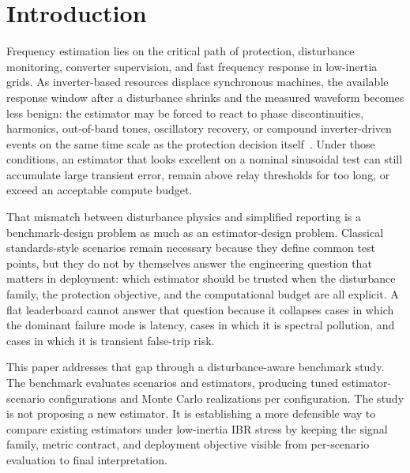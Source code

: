 \section{Introduction}
\label{sec:introduction}

Frequency estimation lies on the critical path of protection, disturbance monitoring, converter supervision, and fast frequency response in low-inertia grids. As inverter-based resources displace synchronous machines, the available response window after a disturbance shrinks and the measured waveform becomes less benign: the estimator may be forced to react to phase discontinuities, harmonics, out-of-band tones, oscillatory recovery, or compound inverter-driven events on the same time scale as the protection decision itself~\cite{Milano2018LowInertia,Pinheiro2025,Ponce2025,Bernal2025,Zoghby2024}. Under those conditions, an estimator that looks excellent on a nominal sinusoidal test can still accumulate large transient error, remain above relay thresholds for too long, or exceed an acceptable compute budget.

That mismatch between disturbance physics and simplified reporting is a benchmark-design problem as much as an estimator-design problem. Classical standards-style scenarios remain necessary because they define common test points, but they do not by themselves answer the engineering question that matters in deployment: which estimator should be trusted when the disturbance family, the protection objective, and the computational budget are all explicit. A flat leaderboard cannot answer that question because it collapses cases in which the dominant failure mode is latency, cases in which it is spectral pollution, and cases in which it is transient false-trip risk.

This paper addresses that gap through a disturbance-aware benchmark study. The benchmark evaluates \ArchivalScenarioCount{} scenarios and \ArchivalEstimatorCount{} estimators, producing \ArchivalPairCount{} tuned estimator-scenario configurations and \ArchivalMonteCarloRuns{} Monte Carlo realizations per configuration. The study is not proposing a new estimator. It is establishing a more defensible way to compare existing estimators under low-inertia IBR stress by keeping the signal family, metric contract, and deployment objective visible from per-scenario evaluation to final interpretation.

